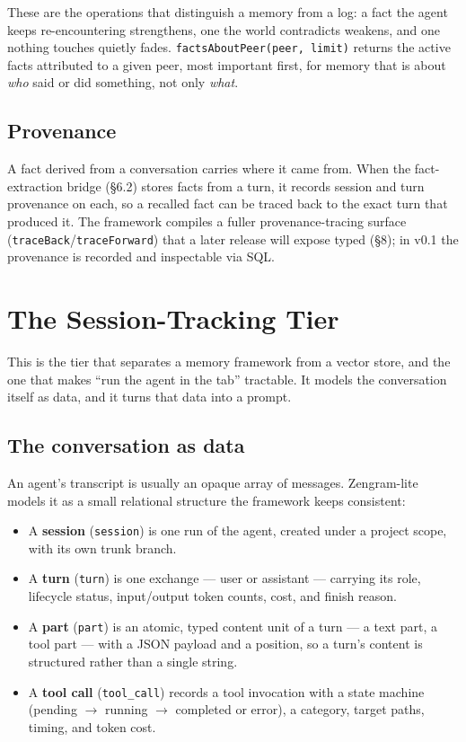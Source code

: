 \documentclass[11pt]{article}
\newcommand{\code}[1]{\texttt{#1}}
\begin{document}
These are the operations that distinguish a memory from a log: a fact the agent
keeps re-encountering strengthens, one the world contradicts weakens, and one
nothing touches quietly fades. \code{factsAboutPeer(peer, limit)} returns the
active facts attributed to a given peer, most important first, for memory that is
about \emph{who} said or did something, not only \emph{what}.

\subsection{Provenance}

A fact derived from a conversation carries where it came from. When the
fact-extraction bridge (\S6.2) stores facts from a turn, it records session and
turn provenance on each, so a recalled fact can be traced back to the exact turn
that produced it. The framework compiles a fuller provenance-tracing surface
(\code{traceBack}/\code{traceForward}) that a later release will expose typed
(\S8); in v0.1 the provenance is recorded and inspectable via SQL.

\section{The Session-Tracking Tier}

This is the tier that separates a memory framework from a vector store, and the
one that makes ``run the agent in the tab'' tractable. It models the conversation
itself as data, and it turns that data into a prompt.

\subsection{The conversation as data}

An agent's transcript is usually an opaque array of messages. Zengram-lite models
it as a small relational structure the framework keeps consistent:
\begin{itemize}[leftmargin=1.4em,itemsep=0.2em]
  \item A \textbf{session} (\code{session}) is one run of the agent, created under
    a project scope, with its own trunk branch.
  \item A \textbf{turn} (\code{turn}) is one exchange --- user or assistant ---
    carrying its role, lifecycle status, input/output token counts, cost, and
    finish reason.
  \item A \textbf{part} (\code{part}) is an atomic, typed content unit of a turn
    --- a text part, a tool part --- with a JSON payload and a position, so a
    turn's content is structured rather than a single string.
  \item A \textbf{tool call} (\code{tool\_call}) records a tool invocation with a
    state machine (pending $\to$ running $\to$ completed or error), a category,
    target paths, timing, and token cost.
\end{itemize}
\end{document}
